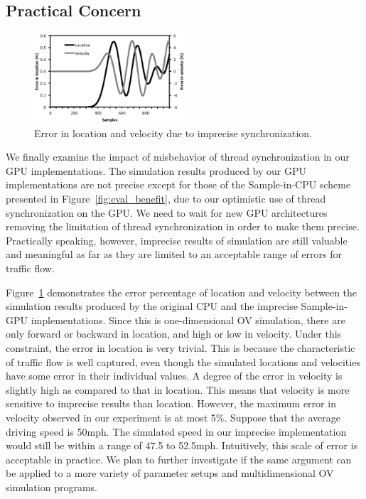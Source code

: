 \documentclass[times, 10pt, twocolumn]{article}
\begin{document}
\subsection{Practical Concern}

\begin{figure}[t]
\centering
\includegraphics[width=0.5\textwidth]{eps/eval_error.eps}
\caption{Error in location and velocity due to imprecise synchronization.}
\label{fig:eval_error}
\end{figure}

We finally examine the impact of misbehavior of thread synchronization
in our GPU implementations.
The simulation results produced by our GPU implementations are not
precise except for those of the Sample-in-CPU scheme presented in
Figure~\ref{fig:eval_benefit}, due to our optimistic use of thread
synchronization on the GPU.
We need to wait for new GPU architectures removing the limitation of
thread synchronization in order to make them precise.
Practically speaking, however, imprecise results of simulation are still
valuable and meaningful as far as they are limited to an acceptable
range of errors for traffic flow.

Figure~\ref{fig:eval_error} demonstrates the error percentage of
location and velocity between the simulation results produced by the
original CPU and the imprecise Sample-in-GPU implementations.
Since this is one-dimensional OV simulation, there are only forward or
backward in location, and high or low in velocity.
Under this constraint, the error in location is very trivial.
This is because the characteristic of traffic flow is well captured,
even though the simulated locations and velocities have some error in
their individual values.
A degree of the error in velocity is slightly high as compared to that
in location.
This means that velocity is more sensitive to imprecise results than
location.
However, the maximum error in velocity observed in our experiment is at
most 5\%.
Suppose that the average driving speed is 50mph.
The simulated speed in our imprecise implementation would still be
within a range of 47.5 to 52.5mph.
Intuitively, this scale of error is acceptable in practice.
We plan to further investigate if the same argument can be applied to a
more variety of parameter setups and multidimensional OV simulation
programs.
\end{document}
